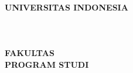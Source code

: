 \thispagestyle{empty}
\begin{center}
\bfseries
\vspace*{0.5cm}
\logoui\\[0.8cm]
UNIVERSITAS INDONESIA\\[3cm]
\thejudul\\[3cm]
\thejenis\\[3.5cm]
\thenama\\[0.3cm]
\thenpm
\vfill
FAKULTAS \thefakultas\\
PROGRAM STUDI \theprodi\\
\thekota\\
\thebulantahun
\end{center}
